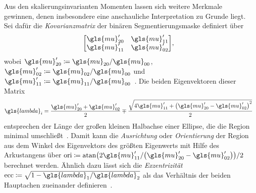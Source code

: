 Aus den skalierungsinvarianten Momenten lassen sich weitere Merkmale gewinnen, denen insbesondere eine anschauliche Interpretation zu Grunde liegt.
Sei dafür die \emph{Kovarianzmatrix} der binären Segmentierungsmaske definiert über
\begin{equation*}
  \begin{bmatrix}
    \gls{mu}^{\prime}_{20} & \gls{mu}^{\prime}_{11}\\
    \gls{mu}^{\prime}_{11} & \gls{mu}^{\prime}_{02}
  \end{bmatrix},
\end{equation*}
wobei $\gls{mu}^{\prime}_{20} \coloneqq \gls{mu}_{20}/\gls{mu}_{00}$, $\gls{mu}^{\prime}_{02} \coloneqq \gls{mu}_{02}/\gls{mu}_{00}$ und $\gls{mu}^{\prime}_{11} \coloneqq \gls{mu}_{11}/\gls{mu}_{00}$~\cite{momente}.
Die beiden Eigenvektoren dieser Matrix
\begin{equation*}
  \gls{lambda}_i = \frac{\gls{mu}^{\prime}_{20} + \gls{mu}^{\prime}_{02}}{2} \mp \frac{\sqrt{4\gls{mu}^{\prime}_{11} + {\left(\gls{mu}^{\prime}_{20} - \gls{mu}^{\prime}_{02}\right)}^2}}{2}
\end{equation*}
entsprechen der Länge der großen \bzw{} kleinen Halbachse einer Ellipse, die die Region minimal umschließt~\cite{momente}.
Damit kann die \emph{Ausrichtung} oder \emph{Orientierung} der Region aus dem Winkel des Eigenvektors des größten Eigenwerts mit Hilfe des Arkustangens über $\mathrm{ori} \coloneqq \mathrm{atan}\left(2\gls{mu}^{\prime}_{11}/\left(\gls{mu}^{\prime}_{20} - \gls{mu}^{\prime}_{02}\right)\right)/2$ berechnet werden.
Ähnlich dazu lässt sich die \emph{Exzentrizität} $\mathrm{ecc} \coloneqq \sqrt{1 - \gls{lambda}_1/\gls{lambda}_2}$ als das Verhältnis der beiden Hauptachen zueinander definieren~\cite{Siedhoff}.

